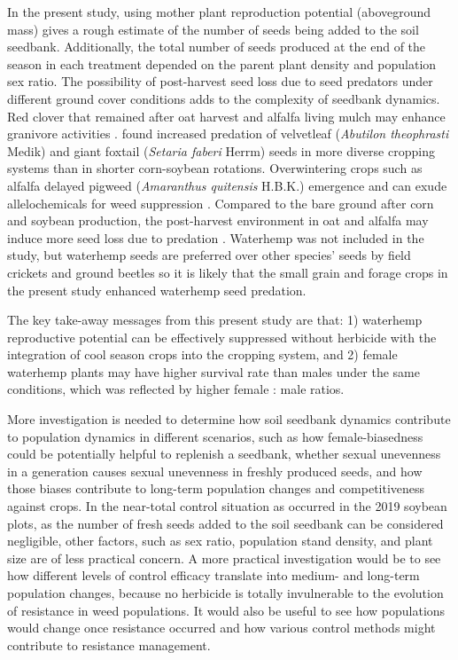 \documentclass[
]{article}
\begin{document}
In the present study, using mother plant reproduction potential (aboveground mass) gives a rough estimate of the number of seeds being added to the soil seedbank. Additionally, the total number of seeds produced at the end of the season in each treatment depended on the parent plant density and population sex ratio. The possibility of post-harvest seed loss due to seed predators under different ground cover conditions adds to the complexity of seedbank dynamics. Red clover that remained after oat harvest and alfalfa living mulch may enhance granivore activities \citep{davisCroppingSystemEffects2003, gallandtEffectCovercroppingSystems2005}. \citet{heggenstallerSeasonalPatternsPostdispersal2006} found increased predation of velvetleaf (\emph{Abutilon theophrasti} Medik) and giant foxtail (\emph{Setaria faberi} Herrm) seeds in more diverse cropping systems than in shorter corn-soybean rotations. Overwintering crops such as alfalfa delayed pigweed (\emph{Amaranthus quitensis} H.B.K.) emergence \citep{huarteUnderstandingMechanismsReduced2003} and can exude allelochemicals for weed suppression \citep{millerAllelopathyForageCrop1996}. Compared to the bare ground after corn and soybean production, the post-harvest environment in oat and alfalfa may induce more seed loss due to predation \citep{gallandtEffectCovercroppingSystems2005}. Waterhemp was not included in the \citet{heggenstallerSeasonalPatternsPostdispersal2006} study, but waterhemp seeds are preferred over other species' seeds by field crickets and ground beetles \citep{vanderlaatPostdispersalWeedSeed2015} so it is likely that the small grain and forage crops in the present study enhanced waterhemp seed predation.  

The key take-away messages from this present study are that: 1) waterhemp reproductive potential can be effectively suppressed without herbicide with the integration of cool season crops into the cropping system, and 2) female waterhemp plants may have higher survival rate than males under the same conditions, which was reflected by higher female : male ratios.  

More investigation is needed to determine how soil seedbank dynamics contribute to population dynamics in different scenarios, such as how female-biasedness could be potentially helpful to replenish a seedbank, whether sexual unevenness in a generation causes sexual unevenness in freshly produced seeds, and how those biases contribute to long-term population changes and competitiveness against crops. In the near-total control situation as occurred in the 2019 soybean plots, as the number of fresh seeds added to the soil seedbank can be considered negligible, other factors, such as sex ratio, population stand density, and plant size are of less practical concern. A more practical investigation would be to see how different levels of control efficacy translate into medium- and long-term population changes, because no herbicide is totally invulnerable to the evolution of resistance in weed populations. It would also be useful to see how populations would change once resistance occurred and how various control methods might contribute to resistance management.
\end{document}
